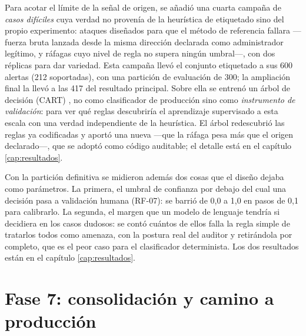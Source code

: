 Para acotar el límite de la señal de origen, se añadió una cuarta campaña de \emph{casos difíciles}
cuya verdad no provenía de la heurística de etiquetado sino del propio experimento: ataques
diseñados para que el método de referencia fallara ---fuerza bruta lanzada desde la misma dirección
declarada como administrador legítimo, y ráfagas cuyo nivel de regla no supera ningún umbral---,
con dos réplicas para dar variedad. Esta campaña llevó el conjunto etiquetado a sus 600 alertas
(212 soportadas), con una partición de evaluación de 300; la ampliación final la llevó a las 417
del resultado principal. Sobre
ella se entrenó un árbol de decisión (CART) \cite{breiman1984cart}, no como clasificador de producción sino como
\emph{instrumento de validación}: para ver qué reglas descubriría el aprendizaje supervisado a esta
escala con una verdad independiente de la heurística. El árbol redescubrió las reglas ya codificadas
y aportó una nueva ---que la ráfaga pesa más que el origen declarado---, que se adoptó como código
auditable; el detalle está en el capítulo \ref{cap:resultados}.

Con la partición definitiva se midieron además dos cosas que el diseño dejaba como parámetros. La
primera, el umbral de confianza por debajo del cual una decisión pasa a validación humana
(RF-07): se barrió de 0,0 a 1,0 en pasos de 0,1 para calibrarlo. La segunda, el margen que un
modelo de lenguaje tendría si decidiera en los casos dudosos: se contó cuántos de ellos falla la
regla simple de tratarlos todos como amenaza, con la postura real del auditor y retirándola por
completo, que es el peor caso para el clasificador determinista. Los dos resultados están en el
capítulo \ref{cap:resultados}.

\section{Fase 7: consolidación y camino a producción}\label{sec:fase7}

